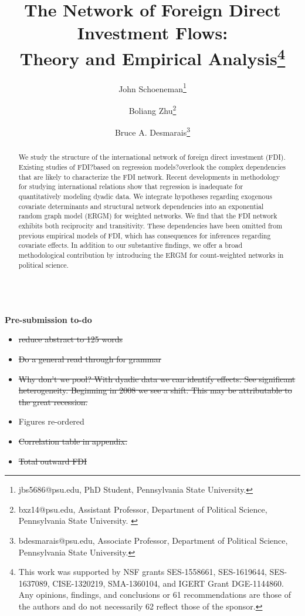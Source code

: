 \documentclass[reqno,onecolumn,letterpaper,12pt]{article}
\begin{document}
\title{The Network of Foreign Direct Investment Flows: \\Theory and Empirical Analysis\footnote{This work was supported by NSF grants SES-1558661, SES-1619644, SES-1637089, CISE-1320219, SMA-1360104, and IGERT Grant DGE-1144860. Any opinions, findings, and conclusions or 61 recommendations are those of the authors and do not necessarily 62 reflect those of the sponsor.}}
\author{John  Schoeneman\thanks{\footnotesize{
jbs5686@psu.edu, PhD Student, Pennsylvania State University.}} \and Boliang Zhu\thanks{\footnotesize{bxz14@psu.edu, Assistant Professor, Department of Political Science, Pennsylvania State University. }} \and Bruce A. Desmarais\thanks{\footnotesize{
bdesmarais@psu.edu, Associate Professor, Department of Political Science, Pennsylvania State University.}}}
\date{}
\maketitle

\thispagestyle{empty}
\singlespacing
\begin{abstract}
    \noindent We study the structure of the international network of foreign direct investment (FDI). Existing studies of FDI?based on regression models?overlook the complex dependencies that are likely to characterize the FDI network. Recent developments in methodology for studying international relations show that regression is inadequate for quantitatively modeling dyadic data. We integrate hypotheses regarding exogenous covariate determinants and structural network dependencies into an exponential random graph model (ERGM) for weighted networks. We find that the FDI network exhibits both reciprocity and transitivity. These dependencies have been omitted from previous empirical models of FDI, which has consequences for inferences regarding covariate effects. In addition to our substantive findings, we offer a broad methodological contribution by introducing the ERGM for count-weighted networks in political science. 

\end{abstract}
~\\

{\bf Pre-submission to-do}
\begin{itemize}
\item \st{reduce abstract to 125 words}
\item \st{Do a general read through for grammar}
\item \st{Why don't we pool? With dyadic data we can identify effects. See significant heterogeneity. Beginning in 2008 we see a shift. This may be attributable to the great recession.}
\item Figures re-ordered
\item \st{Correlation table in appendix.} 
\item \st{Total outward FDI}

\end{itemize}
\end{document}
